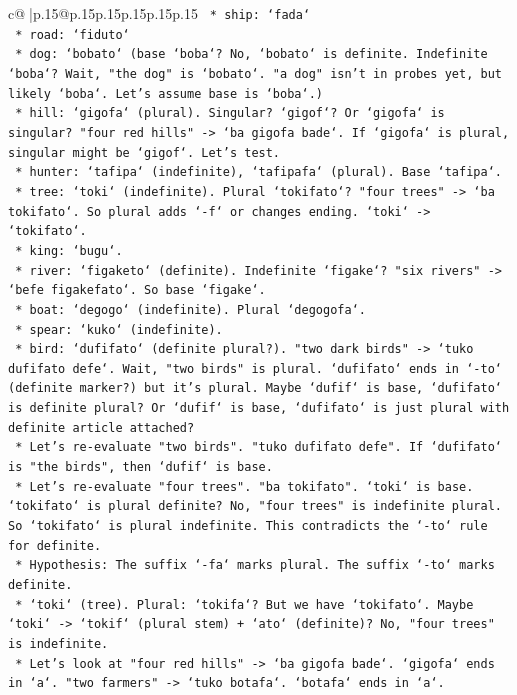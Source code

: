 \documentclass{article}
\begin{document}
{\begin{supertabular}{c@{$\;$}|p{.15\linewidth}@{}p{.15\linewidth}p{.15\linewidth}p{.15\linewidth}p{.15\linewidth}p{.15\linewidth}}
{{{\texttt{    *   ship: `fada`} \\
\texttt{    *   road: `fiduto`} \\
\texttt{    *   dog: `bobato` (base `boba`? No, `bobato` is definite. Indefinite `boba`? Wait, "the dog" is `bobato`. "a dog" isn't in probes yet, but likely `boba`. Let's assume base is `boba`.)} \\
\texttt{    *   hill: `gigofa` (plural). Singular? `gigof`? Or `gigofa` is singular? "four red hills" {-}> `ba gigofa bade`. If `gigofa` is plural, singular might be `gigof`. Let's test.} \\
\texttt{    *   hunter: `tafipa` (indefinite), `tafipafa` (plural). Base `tafipa`.} \\
\texttt{    *   tree: `toki` (indefinite). Plural `tokifato`? "four trees" {-}> `ba tokifato`. So plural adds `{-}f` or changes ending. `toki` {-}> `tokifato`.} \\
\texttt{    *   king: `bugu`.} \\
\texttt{    *   river: `figaketo` (definite). Indefinite `figake`? "six rivers" {-}> `befe figakefato`. So base `figake`.} \\
\texttt{    *   boat: `degogo` (indefinite). Plural `degogofa`.} \\
\texttt{    *   spear: `kuko` (indefinite).} \\
\texttt{    *   bird: `dufifato` (definite plural?). "two dark birds" {-}> `tuko dufifato defe`. Wait, "two birds" is plural. `dufifato` ends in `{-}to` (definite marker?) but it's plural. Maybe `dufif` is base, `dufifato` is definite plural? Or `dufif` is base, `dufifato` is just plural with definite article attached?} \\
\texttt{    *   Let's re{-}evaluate "two birds". "tuko dufifato defe". If `dufifato` is "the birds", then `dufif` is base.} \\
\texttt{    *   Let's re{-}evaluate "four trees". "ba tokifato". `toki` is base. `tokifato` is plural definite? No, "four trees" is indefinite plural. So `tokifato` is plural indefinite. This contradicts the `{-}to` rule for definite.} \\
\texttt{    *   Hypothesis: The suffix `{-}fa` marks plural. The suffix `{-}to` marks definite.} \\
\texttt{        *   `toki` (tree). Plural: `tokifa`? But we have `tokifato`. Maybe `toki` {-}> `tokif` (plural stem) + `ato` (definite)? No, "four trees" is indefinite.} \\
\texttt{        *   Let's look at "four red hills" {-}> `ba gigofa bade`. `gigofa` ends in `a`. "two farmers" {-}> `tuko botafa`. `botafa` ends in `a`.} \\
}}}
\end{supertabular}}
\end{document}
